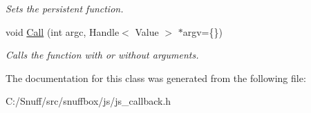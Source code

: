 \begin{DoxyCompactItemize}
\begin{DoxyCompactList}\small\item\em Sets the persistent function. \end{DoxyCompactList}\item 
\hypertarget{classsnuffbox_1_1_j_s_callback_a1a171eed2226f0d529c214536a99ab3f}{void \hyperlink{classsnuffbox_1_1_j_s_callback_a1a171eed2226f0d529c214536a99ab3f}{Call} (int argc, Handle$<$ Value $>$ $\ast$argv=\{\})}\label{classsnuffbox_1_1_j_s_callback_a1a171eed2226f0d529c214536a99ab3f}

\begin{DoxyCompactList}\small\item\em Calls the function with or without arguments. \end{DoxyCompactList}\end{DoxyCompactItemize}


The documentation for this class was generated from the following file\-:\begin{DoxyCompactItemize}
\item 
C\-:/\-Snuff/src/snuffbox/js/js\-\_\-callback.\-h\end{DoxyCompactItemize}
